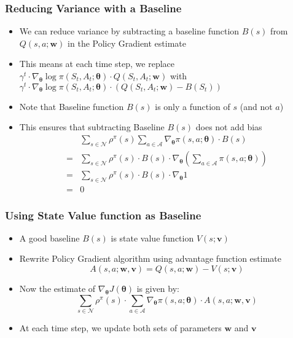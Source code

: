 \documentclass[handout]{beamer}
\begin{document}
\begin{frame}
\frametitle{Reducing Variance with a Baseline}
\pause
\begin{itemize}[<+->]
\item We can reduce variance by subtracting a baseline function $B(s)$ from $Q(s,a;\bm{w})$ in the Policy Gradient estimate
\item This means at each time step, we replace $\gamma^t \cdot \nabla_{\bm{\theta}} \log \pi(S_t,A_t; \bm{\theta}) \cdot Q(S_t,A_t; \bm{w})$ with $\gamma^t \cdot \nabla_{\bm{\theta}} \log \pi(S_t,A_t; \bm{\theta}) \cdot (Q(S_t,A_t; \bm{w}) - B(S_t))$
\item Note that Baseline function $B(s)$ is only a function of $s$ (and not $a$)
\item This ensures that subtracting Baseline $B(s)$ does not add bias
\begin{align*}
& \sum_{s \in \mathcal{N}} \rho^{\pi}(s) \sum_{a \in \mathcal{A}} \nabla_{\bm{\theta}} \pi(s,a; \bm{\theta}) \cdot B(s)\\
 = & \sum_{s \in \mathcal{N}} \rho^{\pi}(s) \cdot B(s) \cdot \nabla_{\bm{\theta}} (\sum_{a \in \mathcal{A}} \pi(s,a; \bm{\theta})) \\
 = & \sum_{s \in \mathcal{N}} \rho^{\pi}(s) \cdot B(s) \cdot \nabla_{\bm{\theta}} 1 \\
  = & 0
\end{align*}
\end{itemize}
\end{frame}

\begin{frame}
\frametitle{Using State Value function as Baseline}
\pause
\begin{itemize}[<+->]
\item A good baseline $B(s)$ is state value function $V(s;\bm{v})$
\item Rewrite Policy Gradient algorithm using advantage function estimate
$$A(s,a;\bm{w},\bm{v}) = Q(s,a;\bm{w}) - V(s; \bm{v})$$
\item Now the estimate of $\nabla_{\bm{\theta}} J(\bm{\theta})$ is given by:
$$\sum_{s \in \mathcal{N}} \rho^{\pi}(s) \cdot \sum_{a \in \mathcal{A}} \nabla_{\bm{\theta}} \pi(s, a; \bm{\theta}) \cdot A(s,a; \bm{w}, \bm{v})$$
\item At each time step, we update both sets of parameters $\bm{w}$ and $\bm{v}$
\end{itemize}
\end{frame}
\end{document}
